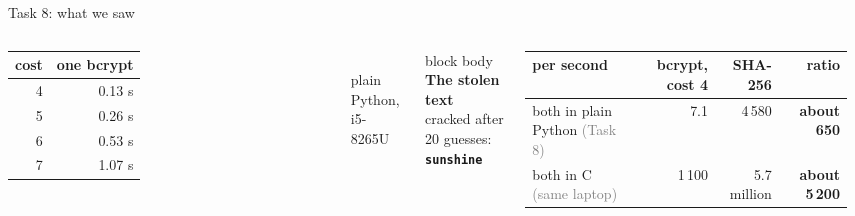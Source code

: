 \documentclass[aspectratio=169,10pt]{beamer}
\newcommand{\samedot}{\addtocounter{subsectionslide}{-1}}
\newcommand{\stepbox}[2]{%
  \begin{beamercolorbox}[rounded=true,sep=0.09cm,wd=\linewidth]{block body}
    \footnotesize\textbf{#1}\\ #2
  \end{beamercolorbox}\vspace{0.06cm}}
\newcommand{\msg}[1]{\textcolor{sViolet}{\textbf{#1}}}
\begin{document}
\samedot
\begin{frame}{Task 8: what we saw}
  \vfill
  \begin{columns}[c,onlytextwidth]
      \centering\small
      \begin{tabular}{@{}rr@{}}
        \toprule
        \textbf{cost} & \textbf{one bcrypt}\\
        \midrule
        4 & 0.13 s\\ 5 & 0.26 s\\ 6 & 0.53 s\\ 7 & 1.07 s\\
        \bottomrule
      \end{tabular}\\[4pt]
      \scriptsize plain Python, i5-8265U\\[8pt]
      \stepbox{The stolen text}{cracked after 20 guesses: \msg{\texttt{sunshine}}}
      \centering\small
      \renewcommand{\arraystretch}{1.35}
      \begin{tabular}{@{}l@{\ \ }r@{\ \ }r@{\ \ }r@{}}
        \toprule
        \textbf{per second} & \textbf{bcrypt, cost 4} & \textbf{SHA-256} & \textbf{ratio}\\
        \midrule
        both in plain Python \textcolor{gray}{(Task 8)} & 7.1 & 4\,580 & \textbf{about 650}\\
        both in C \textcolor{gray}{(same laptop)} & 1\,100 & 5.7 million & \textbf{about 5\,200}\\
        \bottomrule
      \end{tabular}\\[6pt]

\end{columns}
\end{frame}
\end{document}
